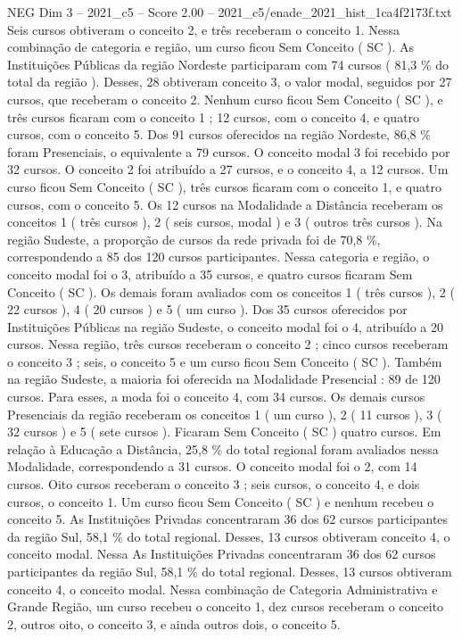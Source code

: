 \begin{textsample}{NEG Dim 3 – 2021\_c5 – Score 2.00 – 2021\_c5/enade\_2021\_hist\_1ca4f2173f.txt}
Seis cursos obtiveram o conceito 2, e três receberam o conceito 1.
Nessa combinação de categoria e região, um curso ficou Sem Conceito ( SC ).
As Instituições Públicas da região Nordeste participaram com 74 cursos ( 81,3 \% do total da região ).
Desses, 28 obtiveram conceito 3, o valor modal, seguidos por 27 cursos, que receberam o conceito 2.
Nenhum curso ficou Sem Conceito ( SC ), e três cursos ficaram com o conceito 1 ; 12 cursos, com o conceito 4, e quatro cursos, com o conceito 5.
Dos 91 cursos oferecidos na região Nordeste, 86,8 \% foram Presenciais, o equivalente a 79 cursos.
O conceito modal 3 foi recebido por 32 cursos.
O conceito 2 foi atribuído a 27 cursos, e o conceito 4, a 12 cursos.
Um curso ficou Sem Conceito ( SC ), três cursos ficaram com o conceito 1, e quatro cursos, com o conceito 5.
Os 12 cursos na Modalidade a Distância receberam os conceitos 1 ( três cursos ), 2 ( seis cursos, modal ) e 3 ( outros três cursos ).
Na região Sudeste, a proporção de cursos da rede privada foi de 70,8 \%, correspondendo a 85 dos 120 cursos participantes.
Nessa categoria e região, o conceito modal foi o 3, atribuído a 35 cursos, e quatro cursos ficaram Sem Conceito ( SC ).
Os demais foram avaliados com os conceitos 1 ( três cursos ), 2 ( 22 cursos ), 4 ( 20 cursos ) e 5 ( um curso ).
Dos 35 cursos oferecidos por Instituições Públicas na região Sudeste, o conceito modal foi o 4, atribuído a 20 cursos.
Nessa região, três cursos receberam o conceito 2 ; cinco cursos receberam o conceito 3 ; seis, o conceito 5 e um curso ficou Sem Conceito ( SC ).
Também na região Sudeste, a maioria foi oferecida na Modalidade Presencial : 89 de 120 cursos.
Para esses, a moda foi o conceito 4, com 34 cursos.
Os demais cursos Presenciais da região receberam os conceitos 1 ( um curso ), 2 ( 11 cursos ), 3 ( 32 cursos ) e 5 ( sete cursos ).
Ficaram Sem Conceito ( SC ) quatro cursos.
Em relação à Educação a Distância, 25,8 \% do total regional foram avaliados nessa Modalidade, correspondendo a 31 cursos.
O conceito modal foi o 2, com 14 cursos.
Oito cursos receberam o conceito 3 ; seis cursos, o conceito 4, e dois cursos, o conceito 1.
Um curso ficou Sem Conceito ( SC ) e nenhum recebeu o conceito 5.
As Instituições Privadas concentraram 36 dos 62 cursos participantes da região Sul, 58,1 \% do total regional.
Desses, 13 cursos obtiveram conceito 4, o conceito modal.
Nessa As Instituições Privadas concentraram 36 dos 62 cursos participantes da região Sul, 58,1 \% do total regional.
Desses, 13 cursos obtiveram conceito 4, o conceito modal.
Nessa combinação de Categoria Administrativa e Grande Região, um curso recebeu o conceito 1, dez cursos receberam o conceito 2, outros oito, o conceito 3, e ainda outros dois, o conceito 5.

\end{textsample}
